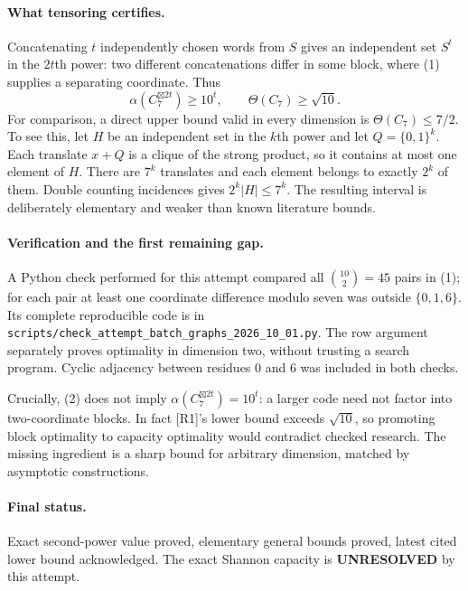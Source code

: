 \documentclass[11pt,a4paper]{article}
\begin{document}
\paragraph{What tensoring certifies.}
Concatenating $t$ independently chosen words from $S$ gives an independent set $S^t$ in the $2t$th power: two different concatenations differ in some block, where (1) supplies a separating coordinate. Thus
\[
 \alpha(C_7^{\boxtimes2t})\ge10^t,
 \qquad \Theta(C_7)\ge\sqrt{10}.
\]
For comparison, a direct upper bound valid in every dimension is $\Theta(C_7)\le7/2$. To see this, let $H$ be an independent set in the $k$th power and let $Q=\{0,1\}^k$. Each translate $x+Q$ is a clique of the strong product, so it contains at most one element of $H$. There are $7^k$ translates and each element belongs to exactly $2^k$ of them. Double counting incidences gives $2^k|H|\le7^k$. The resulting interval is deliberately elementary and weaker than known literature bounds.

\paragraph{Verification and the first remaining gap.}
A Python check performed for this attempt compared all $\binom{10}{2}=45$ pairs in (1); for each pair at least one coordinate difference modulo seven was outside $\{0,1,6\}$. Its complete reproducible code is in \texttt{scripts/check\_attempt\_batch\_graphs\_2026\_10\_01.py}. The row argument separately proves optimality in dimension two, without trusting a search program. Cyclic adjacency between residues $0$ and $6$ was included in both checks.

Crucially, (2) does not imply $\alpha(C_7^{\boxtimes2t})=10^t$: a larger code need not factor into two-coordinate blocks. In fact [R1]'s lower bound exceeds $\sqrt{10}$, so promoting block optimality to capacity optimality would contradict checked research. The missing ingredient is a sharp bound for arbitrary dimension, matched by asymptotic constructions.

\paragraph{Final status.}
Exact second-power value proved, elementary general bounds proved, latest cited lower bound acknowledged. The exact Shannon capacity is \textbf{UNRESOLVED} by this attempt.
\end{document}
